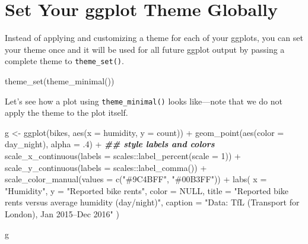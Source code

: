 \documentclass[
]{krantz}
\makeatletter
\newenvironment{Shaded}{\begin{snugshade}}{\end{snugshade}}
\newcommand{\AttributeTok}[1]{\textcolor[rgb]{0.61,0.61,0.61}{#1}}
\newcommand{\ConstantTok}[1]{\textcolor[rgb]{0,0,0}{#1}}
\newcommand{\DecValTok}[1]{\textcolor[rgb]{0.06,0.06,0.06}{#1}}
\newcommand{\DocumentationTok}[1]{\textcolor[rgb]{0.37,0.37,0.37}{\textbf{\textit{#1}}}}
\newcommand{\FunctionTok}[1]{\textcolor[rgb]{0,0,0}{#1}}
\newcommand{\NormalTok}[1]{#1}
\newcommand{\OtherTok}[1]{\textcolor[rgb]{0.37,0.37,0.37}{#1}}
\newcommand{\SpecialCharTok}[1]{\textcolor[rgb]{0,0,0}{#1}}
\newcommand{\StringTok}[1]{\textcolor[rgb]{0.5,0.5,0.5}{#1}}
\newenvironment{kframe}{%
\medskip{}
\setlength{\fboxsep}{.8em}
 \def\at@end@of@kframe{}%
 \ifinner\ifhmode%
  \def\at@end@of@kframe{\end{minipage}}%
  \begin{minipage}{\columnwidth}%
 \fi\fi%
 \def\FrameCommand##1{\hskip\@totalleftmargin \hskip-\fboxsep
 \colorbox{shadecolor}{##1}\hskip-\fboxsep
     \hskip-\linewidth \hskip-\@totalleftmargin \hskip\columnwidth}%
 \MakeFramed {\advance\hsize-\width
   \@totalleftmargin\z@ \linewidth\hsize
   \@setminipage}}%
 {\par\unskip\endMakeFramed%
 \at@end@of@kframe}
\renewenvironment{Shaded}{\begin{kframe}}{\end{kframe}}
\makeatother
\begin{document}
\hypertarget{set-your-ggplot-theme-globally}{%
\section{Set Your ggplot Theme Globally}\label{set-your-ggplot-theme-globally}}

Instead of applying and customizing a theme for each of your ggplots, you can set your theme once and it will be used for all future ggplot output by passing a complete theme to \texttt{theme\_set()}.

\begin{Shaded}
\begin{Highlighting}[]
\FunctionTok{theme\_set}\NormalTok{(}\FunctionTok{theme\_minimal}\NormalTok{())}
\end{Highlighting}
\end{Shaded}

Let's see how a plot using \texttt{theme\_minimal()} looks like---note that we do not apply the theme to the plot itself.

\begin{Shaded}
\begin{Highlighting}[]
\NormalTok{g }\OtherTok{\textless{}{-}} 
  \FunctionTok{ggplot}\NormalTok{(bikes, }\FunctionTok{aes}\NormalTok{(}\AttributeTok{x =}\NormalTok{ humidity, }\AttributeTok{y =}\NormalTok{ count)) }\SpecialCharTok{+}
  \FunctionTok{geom\_point}\NormalTok{(}\FunctionTok{aes}\NormalTok{(}\AttributeTok{color =}\NormalTok{ day\_night), }\AttributeTok{alpha =}\NormalTok{ .}\DecValTok{4}\NormalTok{) }\SpecialCharTok{+}
  \DocumentationTok{\#\# style labels and colors}
  \FunctionTok{scale\_x\_continuous}\NormalTok{(}\AttributeTok{labels =}\NormalTok{ scales}\SpecialCharTok{::}\FunctionTok{label\_percent}\NormalTok{(}\AttributeTok{scale =} \DecValTok{1}\NormalTok{)) }\SpecialCharTok{+}
  \FunctionTok{scale\_y\_continuous}\NormalTok{(}\AttributeTok{labels =}\NormalTok{ scales}\SpecialCharTok{::}\FunctionTok{label\_comma}\NormalTok{()) }\SpecialCharTok{+}
  \FunctionTok{scale\_color\_manual}\NormalTok{(}\AttributeTok{values =} \FunctionTok{c}\NormalTok{(}\StringTok{"\#9C4BFF"}\NormalTok{, }\StringTok{"\#00B3FF"}\NormalTok{)) }\SpecialCharTok{+}
  \FunctionTok{labs}\NormalTok{(}
    \AttributeTok{x =} \StringTok{"Humidity"}\NormalTok{, }\AttributeTok{y =} \StringTok{"Reported bike rents"}\NormalTok{, }\AttributeTok{color =} \ConstantTok{NULL}\NormalTok{,}
    \AttributeTok{title =} \StringTok{"Reported bike rents versus average humidity (day/night)"}\NormalTok{,}
    \AttributeTok{caption =} \StringTok{"Data: TfL (Transport for London), Jan 2015–Dec 2016"}
\NormalTok{  )}
  
\NormalTok{g}
\end{Highlighting}
\end{Shaded}
\end{document}
